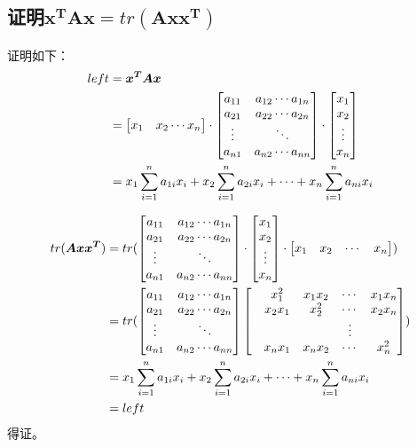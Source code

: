 \documentclass[40pt,a4paper，UTF8]{ctexart}
\numberwithin{equation}{section}
\begin{document}
\subsection{证明$\bm{x^TAx}=tr(\bm{Axx^T})$}
证明如下：
\begin{align}
left&=\bm{x^TAx} \notag \\
&=
\begin{bmatrix}
x_1 & x_2 \cdots x_n 
\end{bmatrix}
\cdot
\begin{bmatrix}
a_{11} &a_{12}\cdots a_{1n} \\
a_{21} &a_{22}\cdots a_{2n} \\
\vdots &\ddots \\
a_{n1} & a_{n2}\cdots a_{nn}
\end{bmatrix}
\cdot
\begin{bmatrix}
x_1\\x_2\\\vdots \\x_n
\end{bmatrix}  \notag \\
&= x_1\sum\limits_{i=1}^{n}a_{1i}x_i + x_2\sum\limits_{i=1}^{n}a_{2i}x_i+\cdots +x_n\sum\limits_{i=1}^{n}a_{ni}x_i
\end{align}

\begin{align}
tr(\bm{Axx^T})
&=tr(
\begin{bmatrix}
a_{11} &a_{12}\cdots a_{1n} \\
a_{21} &a_{22}\cdots a_{2n} \\
\vdots &\ddots \\
a_{n1} & a_{n2}\cdots a_{nn}
\end{bmatrix} 
\cdot
\begin{bmatrix}
x_1\\x_2\\\vdots \\x_n
\end{bmatrix}
\cdot
\begin{bmatrix}
x_1&x_2&\cdots & x_n
\end{bmatrix}
 ) \notag \\
&=tr(
\begin{bmatrix}
a_{11} &a_{12}\cdots a_{1n} \\
a_{21} &a_{22}\cdots a_{2n} \\
\vdots &\ddots \\
a_{n1} & a_{n2}\cdots a_{nn}
\end{bmatrix}
\begin{bmatrix}
&x_1^2 & x_1x_2 & \cdots & x_1x_n  \\
&x_2x_1 & x_2^2 & \cdots & x_2x_n \\
& & & \vdots & \\
&x_nx_1 & x_nx_2 & \cdots & x_n^2
\end{bmatrix}
) \notag \\
&= x_1\sum\limits_{i=1}^{n}a_{1i}x_i + x_2\sum\limits_{i=1}^{n}a_{2i}x_i+\cdots +x_n\sum\limits_{i=1}^{n}a_{ni}x_i \notag \\
&=left
\end{align}
得证。
\end{document}
